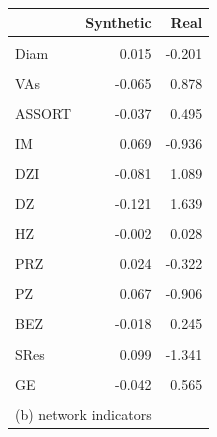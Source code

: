 \documentclass[preprint,
3p]{elsarticle} %
\begin{document}
\begin{table}[H]
\begin{minipage}{0.48\linewidth}
\begin{tabular}{lrr}
\toprule
\textbf{\textbf{ }} & \textbf{\textbf{Synthetic}} & \textbf{\textbf{Real}}\\
\midrule
\cellcolor{gray!10}{Dens} & \cellcolor{gray!10}{-0.123} & \cellcolor{gray!10}{1.667}\\
Diam & 0.015 & -0.201\\
\cellcolor{gray!10}{AVPL} & \cellcolor{gray!10}{0.028} & \cellcolor{gray!10}{-0.374}\\
VAs & -0.065 & 0.878\\
\cellcolor{gray!10}{Mot} & \cellcolor{gray!10}{0.062} & \cellcolor{gray!10}{-0.832}\\
\addlinespace
ASSORT & -0.037 & 0.495\\
\cellcolor{gray!10}{LeM} & \cellcolor{gray!10}{0.046} & \cellcolor{gray!10}{-0.623}\\
IM & 0.069 & -0.936\\
\cellcolor{gray!10}{SGM} & \cellcolor{gray!10}{0.051} & \cellcolor{gray!10}{-0.685}\\
DZI & -0.081 & 1.089\\
\addlinespace
\cellcolor{gray!10}{DZO} & \cellcolor{gray!10}{-0.156} & \cellcolor{gray!10}{2.107}\\
DZ & -0.121 & 1.639\\
\cellcolor{gray!10}{CZ} & \cellcolor{gray!10}{-0.064} & \cellcolor{gray!10}{0.872}\\
HZ & -0.002 & 0.028\\
\cellcolor{gray!10}{EZ} & \cellcolor{gray!10}{0.030} & \cellcolor{gray!10}{-0.412}\\
\addlinespace
PRZ & 0.024 & -0.322\\
\cellcolor{gray!10}{AZ} & \cellcolor{gray!10}{0.031} & \cellcolor{gray!10}{-0.416}\\
PZ & 0.067 & -0.906\\
\cellcolor{gray!10}{BZ} & \cellcolor{gray!10}{0.040} & \cellcolor{gray!10}{-0.541}\\
BEZ & -0.018 & 0.245\\
\addlinespace
\cellcolor{gray!10}{RRes} & \cellcolor{gray!10}{0.083} & \cellcolor{gray!10}{-1.123}\\
SRes & 0.099 & -1.341\\
\cellcolor{gray!10}{ALE} & \cellcolor{gray!10}{0.104} & \cellcolor{gray!10}{-1.408}\\
GE & -0.042 & 0.565\\
\cellcolor{gray!10}{Tra} & \cellcolor{gray!10}{-0.093} & \cellcolor{gray!10}{1.256}\\
\bottomrule
\multicolumn{3}{l}{\rule{0pt}{1em}(b) network indicators}\\
\end{tabular}
\endgroup{}
\end{minipage}
\end{table}
\end{document}
